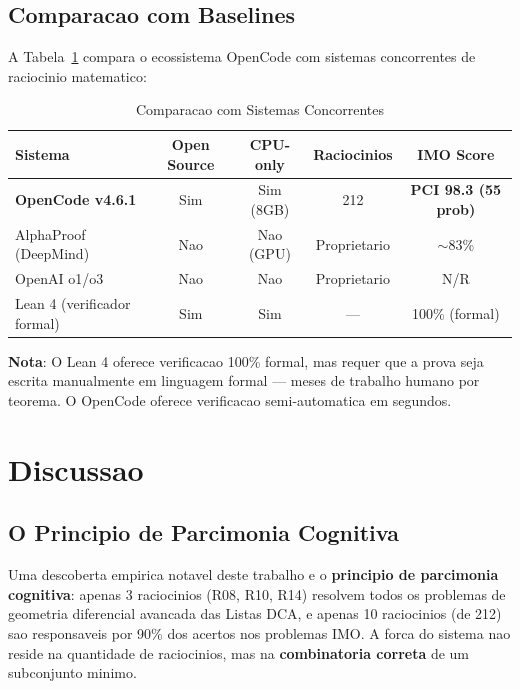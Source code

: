 \documentclass[5p]{elsarticle}
\newcommand{\tabfootnotesize}{\fontsize{9}{11}\selectfont}
\begin{document}
\subsection{Comparacao com Baselines}

A Tabela~\ref{tab:baselines} compara o ecossistema OpenCode com sistemas
concorrentes de raciocinio matematico:

\begin{table}[H]
\centering
\caption{Comparacao com Sistemas Concorrentes}
\label{tab:baselines}
\tabfootnotesize
\begin{tabular}{l c c c c}
\toprule
\textbf{Sistema} & \textbf{Open Source} & \textbf{CPU-only} & \textbf{Raciocinios} & \textbf{IMO Score}\\
\midrule
\textbf{OpenCode v4.6.1} & Sim & Sim (8GB) & 212 & \textbf{PCI 98.3 (55 prob)}\\
AlphaProof (DeepMind) & Nao & Nao (GPU) & Proprietario & $\sim$83\%\\
OpenAI o1/o3 & Nao & Nao & Proprietario & N/R\\
Lean 4 (verificador formal) & Sim & Sim & --- & 100\% (formal)\\
\bottomrule
\end{tabular}
\end{table}

\textbf{Nota}: O Lean 4 oferece verificacao 100\% formal, mas requer que a prova
seja escrita manualmente em linguagem formal --- meses de trabalho humano por
teorema. O OpenCode oferece verificacao semi-automatica em segundos.

\section{Discussao}

\subsection{O Principio de Parcimonia Cognitiva}

Uma descoberta empirica notavel deste trabalho e o \textbf{principio de parcimonia
cognitiva}: apenas 3 raciocinios (R08, R10, R14) resolvem todos os problemas de
geometria diferencial avancada das Listas DCA, e apenas 10 raciocinios (de 212)
sao responsaveis por 90\% dos acertos nos problemas IMO. A forca do sistema nao
reside na quantidade de raciocinios, mas na \textbf{combinatoria correta} de um
subconjunto minimo.
\end{document}
